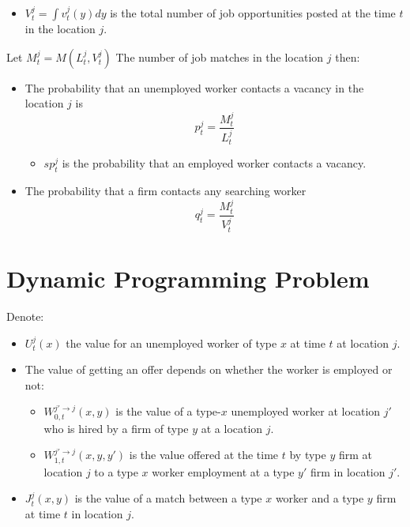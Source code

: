 \documentclass[
  letterpaper,
  DIV=11,
  numbers=noendperiod]{scrreprt}
\providecommand{\tightlist}{%
  \setlength{\itemsep}{0pt}\setlength{\parskip}{0pt}}\usepackage{longtable,booktabs,array}
\begin{document}
\begin{itemize}
\tightlist
\item
  \(V^j_t = \int v^j_t(y) dy\) is the total number of job opportunities
  posted at the time \(t\) in the location \(j\).
\end{itemize}

Let \(M^j_t = M(L^j_t, V^j_t)\) The number of job matches in the
location \(j\) then:

\begin{itemize}
\tightlist
\item
  The probability that an unemployed worker contacts a vacancy in the
  location \(j\) is \[p^j_t = \frac{M^j_t}{L^j_t}\]

  \begin{itemize}
  \tightlist
  \item
    \(sp^j_t\) is the probability that an employed worker contacts a
    vacancy.
  \end{itemize}
\item
  The probability that a ﬁrm contacts any searching worker
  \[q^j_t = \frac{M^j_t}{V^j_t}\]
\end{itemize}

\hypertarget{dynamic-programming-problem}{%
\section{Dynamic Programming
Problem}\label{dynamic-programming-problem}}

Denote:

\begin{itemize}
\tightlist
\item
  \(U^{j}_t(x)\) the value for an unemployed worker of type \(x\) at
  time \(t\) at location \(j\).
\item
  The value of getting an offer depends on whether the worker is
  employed or not:

  \begin{itemize}
  \tightlist
  \item
    \(W^{j'\to j}_{0, t}(x,y)\) is the value of a type-\(x\) unemployed
    worker at location \(j'\) who is hired by a ﬁrm of type \(y\) at a
    location \(j\).
  \item
    \(W^{j'\to j}_{1, t}(x,y,y')\) is the value offered at the time
    \(t\) by type \(y\) firm at location \(j\) to a type \(x\) worker
    employment at a type \(y'\) firm in location \(j'\).
  \end{itemize}
\item
  \(J^j_t(x,y)\) is the value of a match between a type \(x\) worker and
  a type \(y\) firm at time \(t\) in location \(j\).
\end{itemize}
\end{document}
